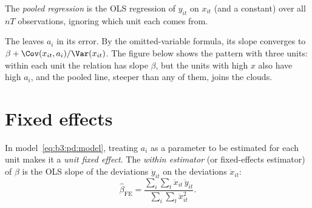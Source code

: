 \begin{definition}\label{def:b3:panel-data:pooled}
The \emph{pooled regression} is the OLS regression of $y_{it}$ on $x_{it}$ (and a
constant) over all $nT$ observations, ignoring which unit each comes from.
\end{definition}

The  leaves $a_i$ in its error. By the omitted-variable formula,
its slope converges to $\beta + \Cov(x_{it}, a_i)/\Var(x_{it})$. The figure
below shows the pattern with three units: within each unit the relation has
slope $\beta$, but the units with high $x$ also have high $a_i$, and the pooled
line, steeper than any of them, joins the clouds.

\begin{omfigure}
\par{}
\end{omfigure}

\section{Fixed effects}\label{sec:b3:panel-data:fixed-effects}

\begin{definition}\label{def:b3:panel-data:within}
In model~\eqref{eq:b3:pd:model}, treating $a_i$ as a parameter to be estimated
for each unit makes it a \emph{unit fixed effect}. The \emph{within estimator}
(or fixed-effects estimator) of $\beta$ is the OLS slope of the deviations
$\ddot y_{it}$ on the deviations $\ddot x_{it}$:
\[
  \hat\beta_{\mathrm{FE}} = \frac{\sum_i \sum_t \ddot x_{it}\, \ddot y_{it}}{\sum_i \sum_t \ddot x_{it}^2}.
\]
\end{definition}

